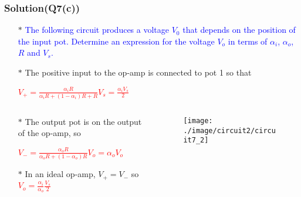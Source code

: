 \documentclass{beamer}
\newcommand{\blue}[1]{\textcolor{blue}{#1}}
\newcommand{\red}[1]{\textcolor{red}{#1}}
\begin{document}

\begin{frame}
\frametitle{Solution(Q7(c))}

\begin{itemize} \itemsep1pt \parskip0pt 
  \item[$\ast$] \blue{The following circuit produces a voltage $V_0$ that depends on the position of the input pot. Determine an expression for the voltage $V_o$ in terms of $\alpha_i$, $\alpha_o$, $R$ and $V_s$.}
  \item[$\ast$] The positive input to the op-amp is connected to pot 1 so that
  \item[] \red{$V_+ = \frac{\alpha_iR}{\alpha_iR+(1-\alpha_i)R+R}V_s = \frac{\alpha_iV_s}{2}$}
\end{itemize}


\begin{columns}

\begin{column}{6cm}
\begin{itemize} \itemsep1pt \parskip0pt 
  \item[$\ast$] The output pot is on the output of the op-amp, so
  \item[] \red{$V_- = \frac{\alpha_oR}{\alpha_oR+(1-\alpha_o)R}V_o = \alpha_oV_o$}
  \item[$\ast$] In an ideal op-amp, $V_+ = V_-$ so \red{$V_o = \frac{\alpha_i}{\alpha_o}\frac{V_s}{2}$}
\end{itemize}
\end{column}


\begin{column}{6cm}
\begin{figure}[H]
  \centering
  \texttt{[image: ./image/circuit2/circuit7\_2]}
\end{figure}
\end{column}

\end{columns}



\end{frame}

\end{document}
